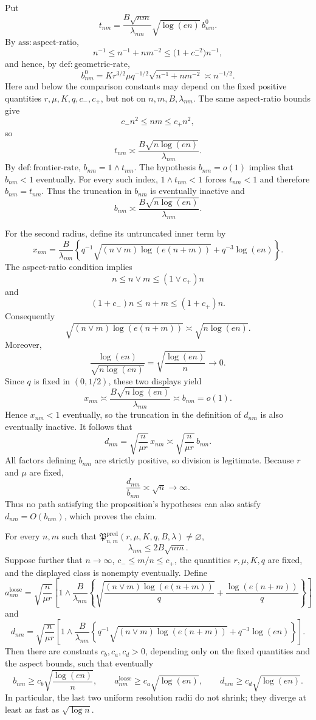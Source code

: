 Put
\[
 t_{nm}=\frac{B\sqrt{nm}}{\lambda_{nm}}\sqrt{\log(en)}\,b^0_{nm}.
\]
By \(\mathrm{ass:aspect\mbox{-}ratio}\),
\[
 n^{-1}\le n^{-1}+nm^{-2}
 \le \bigl(1+c_-^{-2}\bigr)n^{-1},
\]
and hence, by \(\mathrm{def:geometric\mbox{-}rate}\),
\[
 b^0_{nm}
 =K r^{3/2}\mu q^{-1/2}\sqrt{n^{-1}+nm^{-2}}
 \asymp n^{-1/2}.
\]
Here and below the comparison constants may depend on the fixed positive quantities \(r,\mu,K,q,c_-,c_+\), but not on \(n,m,B,\lambda_{nm}\).  The same aspect-ratio bounds give
\[
 c_-n^2\le nm\le c_+n^2,
\]
so
\[
 t_{nm}\asymp
 \frac{B\sqrt{n\log(en)}}{\lambda_{nm}}.
\]
By \(\mathrm{def:frontier\mbox{-}rate}\), \(b_{nm}=1\wedge t_{nm}\).  The hypothesis \(b_{nm}=o(1)\) implies that \(b_{nm}<1\) eventually.  For every such index, \(1\wedge t_{nm}<1\) forces \(t_{nm}<1\) and therefore \(b_{nm}=t_{nm}\).  Thus the truncation in \(b_{nm}\) is eventually inactive and
\[
 b_{nm}\asymp
 \frac{B\sqrt{n\log(en)}}{\lambda_{nm}}.
\]

For the second radius, define its untruncated inner term by
\[
 x_{nm}=\frac B{\lambda_{nm}}
 \left\{q^{-1}\sqrt{(n\vee m)\log(e(n+m))}
 +q^{-3}\log(en)\right\}.
\]
The aspect-ratio condition implies
\[
 n\le n\vee m\le (1\vee c_+)n
\]
and
\[
 (1+c_-)n\le n+m\le(1+c_+)n.
\]
Consequently
\[
 \sqrt{(n\vee m)\log(e(n+m))}
 \asymp\sqrt{n\log(en)}.
\]
Moreover,
\[
 \frac{\log(en)}{\sqrt{n\log(en)}}
 =\sqrt{\frac{\log(en)}n}\longrightarrow0.
\]
Since \(q\) is fixed in \((0,1/2)\), these two displays yield
\[
 x_{nm}\asymp
 \frac{B\sqrt{n\log(en)}}{\lambda_{nm}}
 \asymp b_{nm}=o(1).
\]
Hence \(x_{nm}<1\) eventually, so the truncation in the definition of \(d_{nm}\) is also eventually inactive.  It follows that
\[
 d_{nm}=\sqrt{\frac n{\mu r}}\,x_{nm}
 \asymp\sqrt{\frac n{\mu r}}\,b_{nm}.
\]
All factors defining \(b_{nm}\) are strictly positive, so division is legitimate.  Because \(r\) and \(\mu\) are fixed,
\[
 \frac{d_{nm}}{b_{nm}}\asymp\sqrt n\longrightarrow\infty.
\]
Thus no path satisfying the proposition's hypotheses can also satisfy \(d_{nm}=O(b_{nm})\), which proves the claim.

For every \(n,m\) such that
\(\mathfrak P^{\mathrm{pred}}_{n,m}(r,\mu,K,q,B,\lambda)\neq\varnothing\),
\[
 \lambda_{nm}\le 2B\sqrt{nm}.
\]
Suppose further that \(n\to\infty\), \(c_-\le m/n\le c_+\), the quantities \(r,\mu,K,q\) are fixed, and the displayed class is nonempty eventually.  Define
\[
 a^{\mathrm{loose}}_{nm}=
 \sqrt{\frac n{\mu r}}\left[1\wedge
 \frac B{\lambda_{nm}}\left\{
 \sqrt{\frac{(n\vee m)\log(e(n+m))}{q}}
 +\frac{\log(e(n+m))}{q}
 \right\}\right]
\]
and
\[
 d_{nm}=\sqrt{\frac n{\mu r}}\left[1\wedge
 \frac B{\lambda_{nm}}\left\{
 q^{-1}\sqrt{(n\vee m)\log(e(n+m))}
 +q^{-3}\log(en)
 \right\}\right].
\]
Then there are constants \(c_b,c_a,c_d>0\), depending only on the fixed quantities and the aspect bounds, such that eventually
\[
 b_{nm}\ge c_b\sqrt{\frac{\log(en)}n},\qquad
 a^{\mathrm{loose}}_{nm}\ge c_a\sqrt{\log(en)},\qquad
 d_{nm}\ge c_d\sqrt{\log(en)}.
\]
In particular, the last two uniform resolution radii do not shrink; they diverge at least as fast as \(\sqrt{\log n}\).

